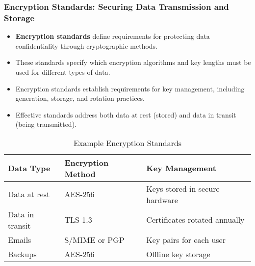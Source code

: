 \documentclass{beamer}
\begin{document}
\begin{frame}
\frametitle{Encryption Standards: Securing Data Transmission and Storage}
\begin{itemize}
\item \textbf{Encryption standards} define requirements for protecting data confidentiality through cryptographic methods.
\item These standards specify which encryption algorithms and key lengths must be used for different types of data.
\item Encryption standards establish requirements for key management, including generation, storage, and rotation practices.
\item Effective standards address both data at rest (stored) and data in transit (being transmitted).
\end{itemize}

\begin{table}
\scriptsize
\begin{tabular}{|p{2.5cm}|p{3cm}|p{3.5cm}|}
\hline
\textbf{Data Type} & \textbf{Encryption Method} & \textbf{Key Management} \\
\hline
Data at rest & AES-256 & Keys stored in secure hardware \\
\hline
Data in transit & TLS 1.3 & Certificates rotated annually \\
\hline
Emails & S/MIME or PGP & Key pairs for each user \\
\hline
Backups & AES-256 & Offline key storage \\
\hline
\end{tabular}
\caption{Example Encryption Standards}
\end{table}
\end{frame}
\end{document}
